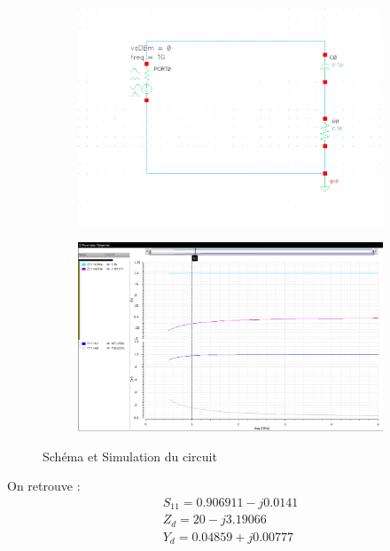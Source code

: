 \documentclass[a4paper]{article}
\begin{document}
\clearpage
\begin{figure}[!htb]
  \begin{subfigure}[t]{.5\linewidth}
      \centering
      \includegraphics[width=1.1\linewidth]{circuit-RC.png}
      \label{fig:rccircuit}
  \end{subfigure}%
  \begin{subfigure}[t]{.5\linewidth}
    \centering
    \includegraphics[width=1.1\linewidth]{sim-inital.png}
    \label{fig:rccircuit-sim}
  \end{subfigure}%
  \caption{Sch\'ema et Simulation du circuit}
  \label{fig:RC-sim}
\end{figure}

On retrouve :
\begin{equation}
  \begin{split}
    S_{11} = 0.906911 - j 0.0141 \\
    Z_{d} = 20 - j 3.19066 \\
    Y_{d} = 0.04859 + j 0.00777
  \end{split}
\end{equation}
\end{document}
